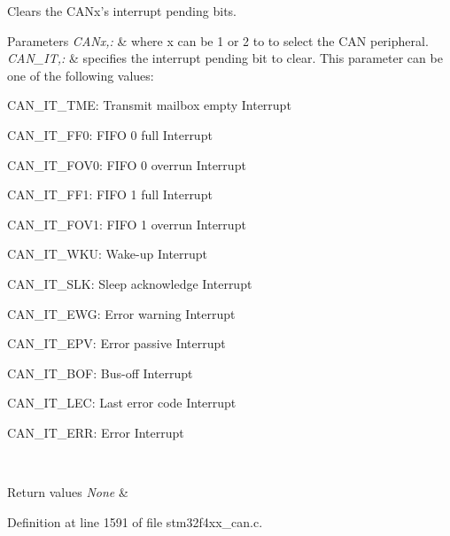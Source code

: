 Clears the C\-A\-Nx's interrupt pending bits. 


\begin{DoxyParams}{Parameters}
{\em C\-A\-Nx,\-:} & where x can be 1 or 2 to to select the C\-A\-N peripheral. \\
\hline
{\em C\-A\-N\-\_\-\-I\-T,\-:} & specifies the interrupt pending bit to clear. This parameter can be one of the following values\-: \begin{DoxyItemize}
\item C\-A\-N\-\_\-\-I\-T\-\_\-\-T\-M\-E\-: Transmit mailbox empty Interrupt \item C\-A\-N\-\_\-\-I\-T\-\_\-\-F\-F0\-: F\-I\-F\-O 0 full Interrupt \item C\-A\-N\-\_\-\-I\-T\-\_\-\-F\-O\-V0\-: F\-I\-F\-O 0 overrun Interrupt \item C\-A\-N\-\_\-\-I\-T\-\_\-\-F\-F1\-: F\-I\-F\-O 1 full Interrupt \item C\-A\-N\-\_\-\-I\-T\-\_\-\-F\-O\-V1\-: F\-I\-F\-O 1 overrun Interrupt \item C\-A\-N\-\_\-\-I\-T\-\_\-\-W\-K\-U\-: Wake-\/up Interrupt \item C\-A\-N\-\_\-\-I\-T\-\_\-\-S\-L\-K\-: Sleep acknowledge Interrupt \item C\-A\-N\-\_\-\-I\-T\-\_\-\-E\-W\-G\-: Error warning Interrupt \item C\-A\-N\-\_\-\-I\-T\-\_\-\-E\-P\-V\-: Error passive Interrupt \item C\-A\-N\-\_\-\-I\-T\-\_\-\-B\-O\-F\-: Bus-\/off Interrupt \item C\-A\-N\-\_\-\-I\-T\-\_\-\-L\-E\-C\-: Last error code Interrupt \item C\-A\-N\-\_\-\-I\-T\-\_\-\-E\-R\-R\-: Error Interrupt \end{DoxyItemize}
\\
\hline
\end{DoxyParams}

\begin{DoxyRetVals}{Return values}
{\em None} & \\
\hline
\end{DoxyRetVals}


Definition at line 1591 of file stm32f4xx\-\_\-can.\-c.

